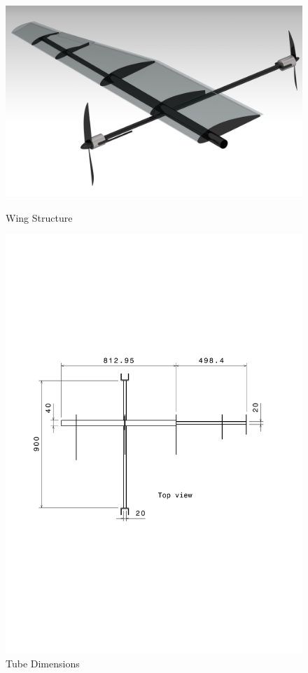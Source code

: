 \begin{figure}[H]
\centering
\begin{minipage}{.5\textwidth}
    \centering
    \includegraphics[width=\textwidth]{Structures/Figures/wing_rendering}
    \caption{Wing Structure}
    \label{fig:wing_rendering}
\end{minipage}%
\begin{minipage}{.5\textwidth}
    \centering
    \includegraphics[width=\textwidth]{Structures/Figures/w_internals}
    \caption{Tube Dimensions}
    \label{fig:w_internals}
\end{minipage}
\end{figure}

